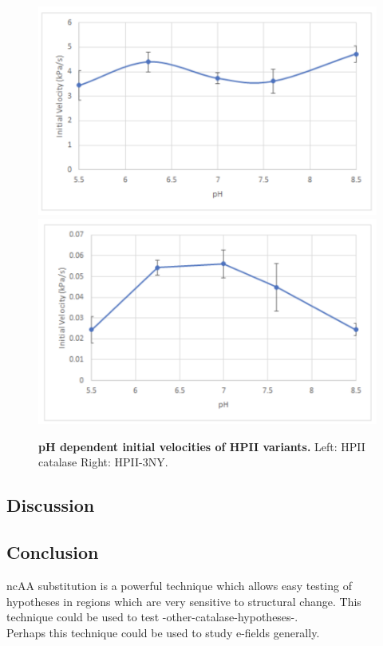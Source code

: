 \documentclass[9pt,twocolumn,twoside]{pnas-new}
\begin{document}
\begin{figure}
  \centering
  \includegraphics[width=0.9\linewidth]{figures/wildtype-velocity.png}
  \includegraphics[width=0.9\linewidth]{figures/3ny-velocity.png}
  \caption{\textbf{pH dependent initial velocities of HPII variants.} Left: HPII catalase Right: HPII-3NY.}
  \label{fig:ph-dependent-velocities}
\end{figure}

\subsection*{Discussion}

\subsection*{Conclusion}

ncAA substitution is a powerful technique which allows easy testing of hypotheses in regions which are very sensitive to structural change. This technique could be used to test -other-catalase-hypotheses-.\\

Perhaps this technique could be used to study e-fields generally.\\
\end{document}
